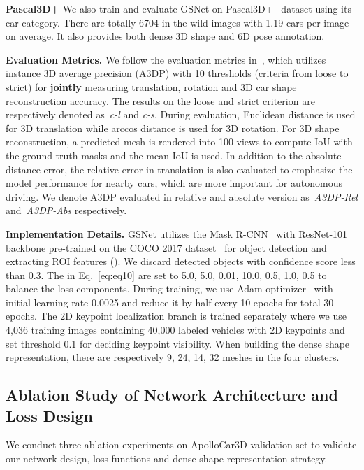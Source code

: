 \documentclass[runningheads]{llncs}
\begin{document}
\smallskip\noindent\textbf{Pascal3D+}
We also train and evaluate GSNet on Pascal3D+~\cite{xiang2014beyond} dataset using its car category. There are totally 6704 in-the-wild images with 1.19 cars per image on average. It also provides both dense 3D shape and 6D pose annotation.

\smallskip\noindent\textbf{Evaluation Metrics.}
We follow the evaluation metrics in~\cite{song2019apollocar3d}, which utilizes instance 3D average precision (A3DP)  with 10 thresholds (criteria from loose to strict) for \textbf{jointly} measuring translation, rotation and 3D car shape reconstruction accuracy. The results on the loose and strict criterion are respectively denoted as~\textit{c-l} and \textit{c-s}. During evaluation, Euclidean distance is used for 3D translation while arccos distance is used for 3D rotation. For 3D shape reconstruction, a predicted mesh is rendered into 100 views to compute IoU with the ground truth masks and the mean IoU is used. In addition to the absolute distance error, the relative error in translation is also evaluated to emphasize the model performance for nearby cars, which are more important for autonomous driving. We denote A3DP evaluated in relative and absolute version as~\textit{A3DP-Rel} and~\textit{A3DP-Abs} respectively.

\smallskip\noindent\textbf{Implementation Details.}
GSNet utilizes the Mask R-CNN~\cite{he2017mask} with ResNet-101 backbone pre-trained on the COCO 2017 dataset~\cite{lin2014microsoft} for object detection and extracting ROI features (). We discard detected objects with confidence score less than 0.3. The  in Eq.~\ref{eq:eq10} are set to 5.0, 5.0, 0.01, 10.0, 0.5, 1.0, 0.5 to balance the loss components.
During training, we use Adam optimizer~\cite{kingma2014adam} with initial learning rate 0.0025 and reduce it by half every 10 epochs for total 30 epochs. The 2D keypoint localization branch is trained separately where we use 4,036 training images containing 40,000 labeled vehicles with 2D keypoints and set threshold 0.1 for deciding keypoint visibility. When building the dense shape representation, there are respectively 9, 24, 14, 32 meshes in the four clusters.

\subsection{Ablation Study of Network Architecture and Loss Design}
\label{sec:ablation} 
We conduct three ablation experiments on ApolloCar3D validation set to validate our network design, loss functions and dense shape representation strategy.
\end{document}
